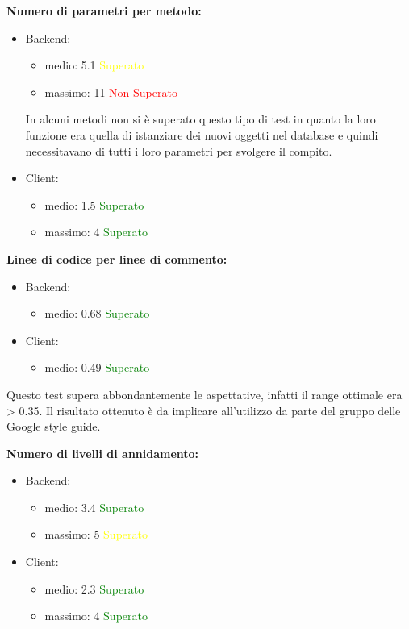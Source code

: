 \begin{description}
				\item \textbf{Numero di parametri per metodo:}
					\begin{itemize}
						\item Backend:
							\begin{itemize}
								\item medio: 5.1 \textcolor{yellow}{Superato}
								\item massimo: 11 \textcolor{red}{Non Superato}
							\end{itemize}
						In alcuni metodi non si è superato questo tipo di test in quanto la loro funzione era quella di istanziare dei nuovi oggetti nel database e quindi necessitavano di tutti i loro parametri per svolgere il compito.
						\item Client:
							\begin{itemize}
								\item medio: 1.5 \textcolor{green}{Superato}
								\item massimo: 4 \textcolor{green}{Superato}
							\end{itemize}
					\end{itemize}
					
				\item \textbf{Linee di codice per linee di commento:}
					\begin{itemize}
						\item Backend:
							\begin{itemize}
								\item medio: 0.68 \textcolor{green}{Superato}
							\end{itemize}
						\item Client:
							\begin{itemize}
								\item medio: 0.49 \textcolor{green}{Superato}
							\end{itemize}
					\end{itemize}
				Questo test supera abbondantemente le aspettative, infatti il range ottimale era > 0.35. Il risultato ottenuto è da implicare all'utilizzo da parte del gruppo delle Google style guide. 
							
				\item \textbf{Numero di livelli di annidamento:}
					\begin{itemize}
						\item Backend:
							\begin{itemize}
								\item medio: 3.4 \textcolor{green}{Superato}
								\item massimo: 5 \textcolor{yellow}{Superato}
							\end{itemize}
						\item Client:
							\begin{itemize}
								\item medio: 2.3 \textcolor{green}{Superato}
								\item massimo: 4 \textcolor{green}{Superato}
							\end{itemize}
					\end{itemize}
					

\end{description}

